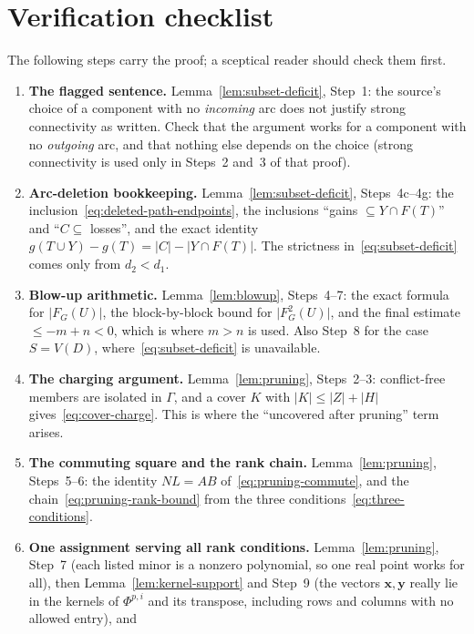 \documentclass[11pt]{article}
\theoremstyle{remark}
\newcommand{\abs}[1]{\lvert #1\rvert}
\begin{document}
\section{Verification checklist}\label{sec:checklist}

The following steps carry the proof; a sceptical reader should check them
first.

\begin{enumerate}[leftmargin=2em]
\item \textbf{The flagged sentence.}
 Lemma~\ref{lem:subset-deficit}, Step~1: the source's choice of a
 component with no \emph{incoming} arc does not justify strong
 connectivity as written.  Check that the argument works for a component
 with no \emph{outgoing} arc, and that nothing else depends on the choice
 (strong connectivity is used only in Steps~2 and~3 of that proof).
\item \textbf{Arc-deletion bookkeeping.}
 Lemma~\ref{lem:subset-deficit}, Steps~4c--4g: the
 inclusion~\eqref{eq:deleted-path-endpoints}, the inclusions ``gains
 $\subseteq Y\cap F(T)$'' and ``$C\subseteq$ losses'', and the exact
 identity $g(T\cup Y)-g(T)=\abs C-\abs{Y\cap F(T)}$.  The strictness
 in~\eqref{eq:subset-deficit} comes only from $d_2<d_1$.
\item \textbf{Blow-up arithmetic.}
 Lemma~\ref{lem:blowup}, Steps~4--7: the exact formula for
 $\abs{F_G(U)}$, the block-by-block bound for $\abs{F_G^2(U)}$, and the
 final estimate $\le -m+n<0$, which is where $m>n$ is used.  Also Step~8
 for the case $S=V(D)$, where~\eqref{eq:subset-deficit} is unavailable.
\item \textbf{The charging argument.}
 Lemma~\ref{lem:pruning}, Steps~2--3: conflict-free members are isolated
 in $\Gamma$, and a cover $K$ with $\abs K\le\abs Z+\abs H$
 gives~\eqref{eq:cover-charge}.  This is where the ``uncovered after
 pruning'' term arises.
\item \textbf{The commuting square and the rank chain.}
 Lemma~\ref{lem:pruning}, Steps~5--6: the identity $NL=AB$
 of~\eqref{eq:pruning-commute}, and the
 chain~\eqref{eq:pruning-rank-bound} from the three
 conditions~\eqref{eq:three-conditions}.
\item \textbf{One assignment serving all rank conditions.}
 Lemma~\ref{lem:pruning}, Step~7 (each listed minor is a nonzero
 polynomial, so one real point works for all), then
 Lemma~\ref{lem:kernel-support} and Step~9 (the vectors
 $\mathbf x,\mathbf y$ really lie in the kernels of $\Phi^{p,i}$ and its
 transpose, including rows and columns with no allowed entry), and

\end{enumerate}
\end{document}
